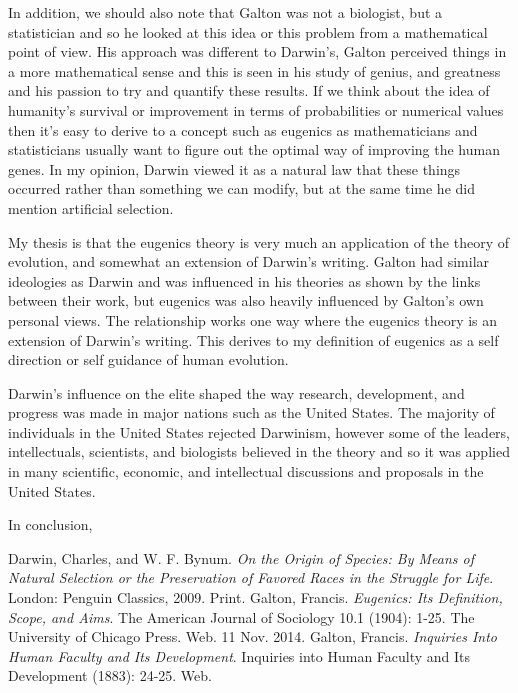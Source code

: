 \documentclass[11pt, oneside]{article}
\begin{document}
\par In addition, we should also note that Galton was not a biologist, but a statistician and so he looked at this idea or this problem from a mathematical point of view. His approach was different to Darwin's, Galton perceived things in a more mathematical sense and this is seen in his study of genius, and greatness and his passion to try and quantify these results. If we think about the idea of humanity's survival or improvement in terms of probabilities or numerical values then it's easy to derive to a concept such as eugenics as mathematicians and statisticians usually want to figure out the optimal way of improving the human genes. In my opinion, Darwin viewed it as a natural law that these things occurred rather than something we can modify, but at the same time he did mention artificial selection.

\par My thesis is that the eugenics theory is very much an application of the theory of evolution, and somewhat an extension of Darwin's writing. Galton had similar ideologies as Darwin and was influenced in his theories as shown by the links between their work, but eugenics was also heavily influenced by Galton's own personal views. The relationship works one way where the eugenics theory is an extension of Darwin's writing. This derives to my definition of eugenics as a self direction or self guidance of human evolution. 

\par Darwin's influence on the elite shaped the way research, development, and progress was made in major nations such as the United States. The majority of individuals in the United States rejected Darwinism, however some of the leaders, intellectuals, scientists, and biologists believed in the theory and so it was applied in many scientific, economic, and intellectual discussions and proposals in the United States. 

\par In conclusion, 

\begin{thebibliography}{9}
  Darwin, Charles, and W. F. Bynum.
  \emph{On the Origin of Species: By Means of Natural Selection or the Preservation of Favored Races in the Struggle for Life}.
  London: Penguin Classics, 2009.
  Print.
  Galton, Francis.
  \emph{Eugenics: Its Definition, Scope, and Aims}.
  The American Journal of Sociology 10.1 (1904): 1-25.
  The University of Chicago Press. Web. 11 Nov. 2014.
  Galton, Francis.
  \emph{Inquiries Into Human Faculty and Its Development}.
  Inquiries into Human Faculty and Its Development (1883): 24-25. 
  Web.
\end{thebibliography}
\end{document}
